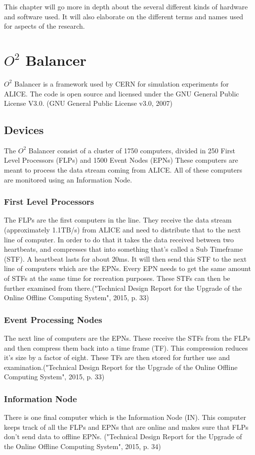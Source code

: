 This chapter will go more in depth about the several different kinds of hardware and software used. It will also elaborate on the different terms and names used for aspects of the research.
\section{$O^2$ Balancer}
$O^2$ Balancer is a framework used by CERN for simulation experiments for ALICE. The code is open source and licensed under the GNU General Public License V3.0. (GNU General Public License v3.0, 2007)

\subsection{Devices}
The $O^2$ Balancer consist of a cluster of 1750 computers, divided in 250 First Level Processors (FLPs) and 1500 Event  Nodes (EPNs) These computers are meant to process the data stream coming from ALICE. All of these computers are monitored using an Information Node.

\subsubsection*{First Level Processors}
The FLPs are the first computers in the line. They receive the data stream (approximately 1.1TB/s) from ALICE and need to distribute that to the next line of computer. In order to do that it takes the data received between two heartbeats, and compresses that into something that's called a Sub Timeframe (STF). A heartbeat lasts for about 20ms. It will then send this STF to the next line of computers which are the EPNs. Every EPN needs to get the same amount of STFs at the same time for recreation purposes. These STFs can then be further examined from there.("Technical Design Report for the Upgrade of the Online Offline Computing System", 2015, p. 33)

\subsubsection*{Event Processing Nodes}
The next line of computers are the EPNs. These receive the STFs from the FLPs and then compress them back into a time frame (TF). This compression reduces it's size by a factor of eight. These TFs are then stored for further use and examination.("Technical Design Report for the Upgrade of the Online Offline Computing System", 2015, p. 33)

\subsubsection*{Information Node}
There is one final computer which is the Information Node (IN). This computer keeps track of all the FLPs and EPNs that are online and makes sure that FLPs don't send data to offline EPNs. ("Technical Design Report for the Upgrade of the Online Offline Computing System", 2015, p. 34)

